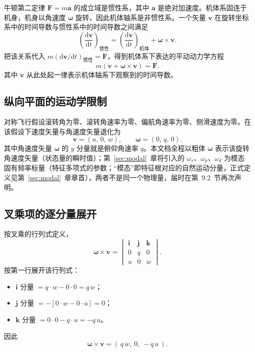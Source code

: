 \documentclass[11pt,a4paper]{ctexart}
\newcommand{\ud}[1]{\dot{#1}}
\newcommand{\bvec}[1]{\boldsymbol{#1}}
\newcommand{\dd}{\mathrm{d}}
\begin{document}
牛顿第二定律 $\bvec{F}=m\bvec{a}$ 的成立域是惯性系，其中 $\bvec{a}$ 是绝对加速度。机体系固连于机身，机身以角速度 $\bvec{\omega}$ 旋转，因此机体轴系是非惯性系。一个矢量 $\bvec{v}$ 在旋转坐标系中的时间导数与惯性系中的时间导数之间满足
\begin{equation}
\left(\frac{\dd\bvec{v}}{\dd t}\right)_{\text{惯性}}
= \left(\frac{\dd\bvec{v}}{\dd t}\right)_{\text{机体}} + \bvec{\omega}\times\bvec{v}.
\end{equation}
把该关系代入 $m(\dd\bvec{v}/\dd t)_{\text{惯性}} = \bvec{F}$，得到机体系下表达的平动动力学方程
\begin{equation}\label{eq:1-1}
m\left(\ud{\bvec{v}} + \bvec{\omega}\times\bvec{v}\right) = \bvec{F}.
\tag{(1-1)}
\end{equation}
其中 $\ud{\bvec{v}}$ 从此处起一律表示机体轴系下观察到的时间导数。

\subsection{纵向平面的运动学限制}

对称飞行假设滚转角为零、滚转角速率为零、偏航角速率为零、侧滑速度为零。在该假设下速度矢量与角速度矢量退化为
\begin{equation}\label{eq:1-2}
\bvec{v} = (u,\,0,\,w), \qquad \bvec{\omega} = (0,\,q,\,0).
\tag{(1-2)}
\end{equation}
其中角速度矢量 $\bvec{\omega}$ 的 $y$ 分量就是俯仰角速率 $q$。本文档全程以粗体 $\bvec{\omega}$ 表示该旋转角速度矢量（状态量的瞬时值）；第~\ref{sec:modal}~章将引入的 $\omega_s$、$\omega_p$、$\omega_d$ 为模态固有频率标量（特征多项式的参数；“模态”即特征根对应的自然运动分量，正式定义见第~\ref{sec:modal}~章章首），两者不是同一个物理量，届时在第~9.2~节再次声明。

\subsection{叉乘项的逐分量展开}

按叉乘的行列式定义，
\[
\bvec{\omega}\times\bvec{v}
= \begin{vmatrix} \bvec{i} & \bvec{j} & \bvec{k} \\ 0 & q & 0 \\ u & 0 & w \end{vmatrix}.
\]
按第一行展开该行列式：
\begin{itemize}[itemsep=1pt]
  \item $\bvec{i}$ 分量 $= q\cdot w - 0\cdot 0 = q\,w$；
  \item $\bvec{j}$ 分量 $= -\left[0\cdot w - 0\cdot u\right] = 0$；
  \item $\bvec{k}$ 分量 $= 0\cdot 0 - q\cdot u = -q\,u$。
\end{itemize}
因此
\begin{equation}\label{eq:1-3}
\bvec{\omega}\times\bvec{v} = (\,q\,w,\ 0,\ -q\,u\,).
\tag{(1-3)}
\end{equation}
\end{document}
